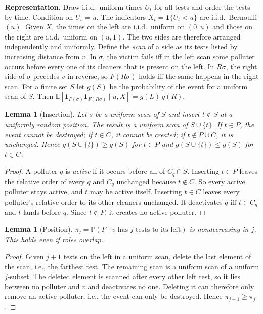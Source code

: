 \documentclass[11pt,a4paper]{article}
\newtheorem{lemma}[theorem]{Lemma}
\theoremstyle{definition}\newtheorem{definition}[theorem]{Definition}
\theoremstyle{remark}\newtheorem{remark}[theorem]{Remark}
\newcommand{\E}{\mathbb E}
\newcommand{\Prb}{\mathbb P}
\theoremstyle{definition}\newtheorem{xexample}[xtheorem]{Example}\theoremstyle{plain}
\begin{document}
\textbf{Representation.} Draw i.i.d.\ uniform times $U_t$ for all tests and order the tests by time. Condition on $U_v=u$. The indicators $X_t=\mathbf 1\{U_t<u\}$ are i.i.d.\ Bernoulli$(u)$. Given $X$, the times on the left are i.i.d.\ uniform on $(0,u)$ and those on the right are i.i.d.\ uniform on $(u,1)$. The two sides are therefore arranged independently and uniformly. Define the \emph{scan} of a side as its tests listed by increasing distance from $v$. In $\sigma$, the victim fails iff in the left scan some polluter occurs before every one of its cleaners that is present on the left. In $R\sigma$, the right side of $\sigma$ precedes $v$ in reverse, so $F(R\sigma)$ holds iff the same happens in the right scan. For a finite set $S$ let $g(S)$ be the probability of the event for a uniform scan of $S$. Then $\E[\mathbf 1_{F(\sigma)}\mathbf 1_{F(R\sigma)}\mid u,X]=g(L)\,g(R)$.

\begin{lemma}[Insertion]\label{lem:ins}
Let $s$ be a uniform scan of $S$ and insert $t\notin S$ at a uniformly random position. The result is a uniform scan of $S\cup\{t\}$. If $t\in P$, the event cannot be destroyed; if $t\in C$, it cannot be created; if $t\notin P\cup C$, it is unchanged. Hence $g(S\cup\{t\})\ge g(S)$ for $t\in P$ and $g(S\cup\{t\})\le g(S)$ for $t\in C$.
\end{lemma}
\begin{proof}
A polluter $q$ is \emph{active} if it occurs before all of $C_q\cap S$. Inserting $t\in P$ leaves the relative order of every $q$ and $C_q$ unchanged because $t\notin C$. So every active polluter stays active, and $t$ may be active itself. Inserting $t\in C$ leaves every polluter's relative order to its other cleaners unchanged. It deactivates $q$ iff $t\in C_q$ and $t$ lands before $q$. Since $t\notin P$, it creates no active polluter.
\end{proof}

\begin{lemma}[Position]\label{lem:pos}
$\pi_j=\Prb(F\mid v\text{ has }j\text{ tests to its left})$ is nondecreasing in $j$. This holds even if roles overlap.
\end{lemma}
\begin{proof}
Given $j{+}1$ tests on the left in a uniform scan, delete the last element of the scan, i.e., the farthest test. The remaining scan is a uniform scan of a uniform $j$-subset. The deleted element is scanned after every other left test, so it lies between no polluter and $v$ and deactivates no one. Deleting it can therefore only remove an active polluter, i.e., the event can only be destroyed. Hence $\pi_{j+1}\ge\pi_j$.
\end{proof}
\end{document}
